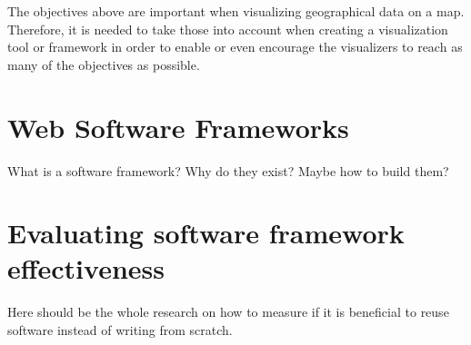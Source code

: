 The objectives above are important when visualizing geographical data on a map. Therefore, it is needed to take those into account when creating a visualization tool or framework in order to enable or even encourage the visualizers to reach as many of the objectives as possible.


\section{Web Software Frameworks}

What is a software framework? Why do they exist? Maybe how to build them?

\section{Evaluating software framework effectiveness}

Here should be the whole research on how to measure if it is beneficial to reuse software instead of writing from scratch.
